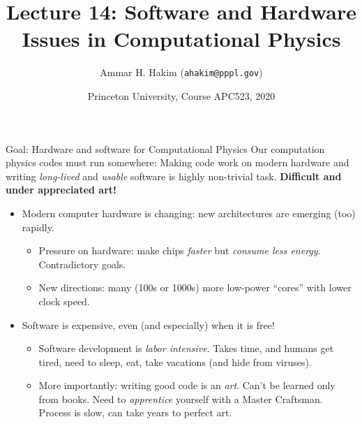 \documentclass[aspectratio=169]{beamer}
\title[{\tt }] {Lecture 14: Software and Hardware Issues in Computational Physics}%
\author[https://apc523-2020.rtfd.io]%
{Ammar H. Hakim ({\tt ahakim@pppl.gov}) \inst{1}}%
\institute[PPPL]
{ \inst{1} Princeton Plasma Physics Laboratory, Princeton, NJ %
}
\date[3/23/2020]{Princeton University, Course APC523, 2020}
\newcommand{\cramplist}{
	\setlength{\itemsep}{0in}
	\setlength{\partopsep}{0in}
	\setlength{\topsep}{0in}}
\begin{document}
\begin{frame}[plain]
  \titlepage
\end{frame}

\begin{frame}{Goal: Hardware and software for Computational Physics}
  Our computation physics codes must run somewhere: Making code work
  on modern hardware and writing \emph{long-lived} and \emph{usable}
  software is highly non-trivial task. {\bf Difficult
    and under appreciated art!}
  \begin{itemize}
  \item Modern computer hardware is changing: new architectures are
    emerging (too) rapidly.
    \begin{itemize}\cramplist
    \item Pressure on hardware: make chips \emph{faster} but
      \emph{consume less energy}. Contradictory goals.
    \item New directions: many (100s or 1000s) more low-power
      ``cores'' with lower clock speed.
    \end{itemize}
  \item Software is expensive, even (and especially) when it is free!
    \begin{itemize}\cramplist
    \item Software development is \emph{labor intensive}. Takes time,
      and humans get tired, need to sleep, eat, take vacations (and
      hide from viruses).
    \item More importantly: writing good code is an \emph{art}. Can't
      be learned only from books. Need to \emph{apprentice} yourself
      with a Master Craftsman. Process is slow, can take years to
      perfect art.
    \end{itemize}
  \end{itemize}
\end{frame}
\end{document}
